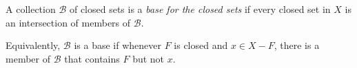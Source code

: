 A collection $\mathcal{B}$ of closed sets is a \emph{base for the closed sets} if every closed set in $X$ is an intersection of members of $\mathcal{B}$.

Equivalently, $\mathcal{B}$ is a base if whenever $F$ is closed and $x \in X - F$, there is a member of $\mathcal{B}$ that contains $F$ but not $x$.
